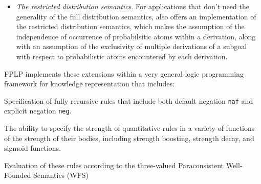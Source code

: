 \begin{itemize}
\item {\em The restricted distribution semantics}.  For applications
that don't need the generality of the full distribution
semantics, \ourtool{} also offers an implementation of the restricted
distribution semantics, which makes the assumption of the independence
of occurrence of probabilsitic atoms within a derivation, along with
an assumption of the exclusivity of multiple derivations of a subgoal
with respect to probabilistic atoms encountered by each derivation.
\end{itemize}
\ei 

FPLP implements these extensions within a very general logic
programming framework for knowledge representation that includes:

\bi
%
\item Specification of fully recursive rules that include both default
negation {\tt naf} and explicit negation {\tt neg}.

\item The ability to specify the strength of quantitative rules in a
  variety of functions of the strength of their bodies, including 
  strength boosting, strength decay, and sigmoid functions.
%
\item Evaluation of these rules according to the three-valued
Paraconsistent Well-Founded Semantics (WFS)
\ei
